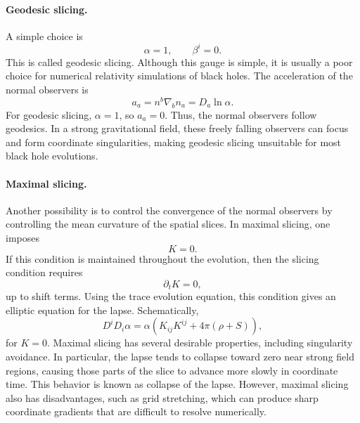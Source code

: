 \paragraph{Geodesic slicing.}
A simple choice is
\begin{equation}
\alpha=1,
\qquad
\beta^i=0 .
\end{equation}
This is called geodesic slicing. Although this gauge is simple, it is usually a poor choice for numerical relativity simulations of black holes. The acceleration of the normal observers is
\begin{equation}
a_a
=
n^b\nabla_b n_a
=
D_a\ln\alpha .
\end{equation}
For geodesic slicing, $\alpha=1$, so $a_a=0$. Thus, the normal observers follow geodesics. In a strong gravitational field, these freely falling observers can focus and form coordinate singularities, making geodesic slicing unsuitable for most black hole evolutions.

\paragraph{Maximal slicing.}
Another possibility is to control the convergence of the normal observers by controlling the mean curvature of the spatial slices. In maximal slicing, one imposes
\begin{equation}
K=0 .
\end{equation}
If this condition is maintained throughout the evolution, then the slicing condition requires
\begin{equation}
\partial_t K = 0,
\end{equation}
up to shift terms. Using the trace evolution equation, this condition gives an elliptic equation for the lapse. Schematically,
\begin{equation}
D^iD_i\alpha
=
\alpha
\left(
K_{ij}K^{ij}
+
4\pi(\rho+S)
\right),
\end{equation}
for $K=0$. Maximal slicing has several desirable properties, including singularity avoidance. In particular, the lapse tends to collapse toward zero near strong field regions, causing those parts of the slice to advance more slowly in coordinate time. This behavior is known as collapse of the lapse. However, maximal slicing also has disadvantages, such as grid stretching, which can produce sharp coordinate gradients that are difficult to resolve numerically.


